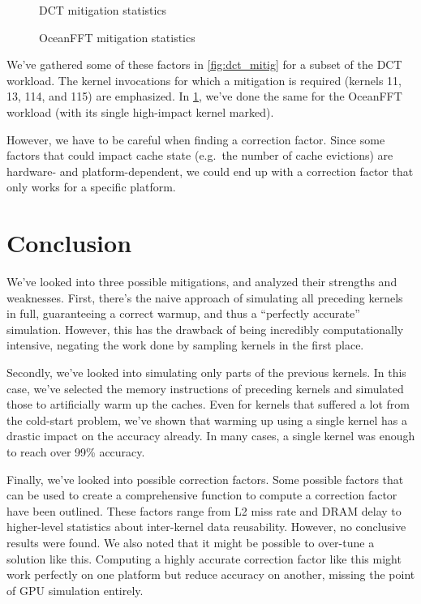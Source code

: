 \begin{figure}[hb]
    \centering
    
    \caption{DCT mitigation statistics}
    \label{fig:dct_mitig}
    
    \caption{OceanFFT mitigation statistics}
    \label{fig:ocean_mitig}
\end{figure}

We've gathered some of these factors in \cref{fig:dct_mitig} for a subset of the DCT workload.
The kernel invocations for which a mitigation is required (kernels 11, 13, 114, and 115) are emphasized.
In \cref{fig:ocean_mitig}, we've done the same for the OceanFFT workload (with its single high-impact kernel marked).

However, we have to be careful when finding a correction factor.
Since some factors that could impact cache state (e.g.\ the number of cache evictions) are hardware- and platform-dependent, we could end up with a correction factor that only works for a specific platform.

\FloatBarrier
\section{Conclusion}\label{sec:mitigation-conclusion}

We've looked into three possible mitigations, and analyzed their strengths and weaknesses.
First, there's the naive approach of simulating all preceding kernels in full, guaranteeing a correct warmup, and thus a ``perfectly accurate'' simulation.
However, this has the drawback of being incredibly computationally intensive, negating the work done by sampling kernels in the first place.

Secondly, we've looked into simulating only parts of the previous kernels.
In this case, we've selected the memory instructions of preceding kernels and simulated those to artificially warm up the caches.
Even for kernels that suffered a lot from the cold-start problem, we've shown that warming up using a single kernel has a drastic impact on the accuracy already.
In many cases, a single kernel was enough to reach over 99\% accuracy.

Finally, we've looked into possible correction factors.
Some possible factors that can be used to create a comprehensive function to compute a correction factor have been outlined.
These factors range from L2 miss rate and DRAM delay to higher-level statistics about inter-kernel data reusability.
However, no conclusive results were found.
We also noted that it might be possible to over-tune a solution like this.
Computing a highly accurate correction factor like this might work perfectly on one platform but reduce accuracy on another, missing the point of GPU simulation entirely.